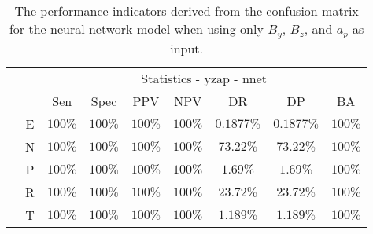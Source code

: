 \begin{table}[!ht]
	\centering
	\begin{tabular}{|c|c|c|c|c|c|c|c|c|}
		\cline{3-9}
		\multicolumn{2}{c|}{} & \multicolumn{7}{c|}{Statistics - yzap - nnet} \\ \cline{3-9}
		\multicolumn{2}{c|}{} & Sen & Spec & PPV & NPV & DR & DP & BA \\ \hline
		\multirow{5}{*}{\rotatebox{90}{Class}} & E & $100\%$ & $100\%$ & $100\%$ & $100\%$ & $0.1877\%$ & $0.1877\%$ & $100\%$ \\ \cline{2-9}
		 & N & $100\%$ & $100\%$ & $100\%$ & $100\%$ & $73.22\%$ & $73.22\%$ & $100\%$ \\ \cline{2-9}
		 & P & $100\%$ & $100\%$ & $100\%$ & $100\%$ & $1.69\%$ & $1.69\%$ & $100\%$ \\ \cline{2-9}
		 & R & $100\%$ & $100\%$ & $100\%$ & $100\%$ & $23.72\%$ & $23.72\%$ & $100\%$ \\ \cline{2-9}
		 & T & $100\%$ & $100\%$ & $100\%$ & $100\%$ & $1.189\%$ & $1.189\%$ & $100\%$ \\ \hline
	\end{tabular}
	\caption{The performance indicators derived from the confusion matrix for the neural network model when using only $B_{y}$, $B_{z}$, and $a_{p}$ as input.}
	\label{tab:cs:yzap:nnet}
\end{table}
